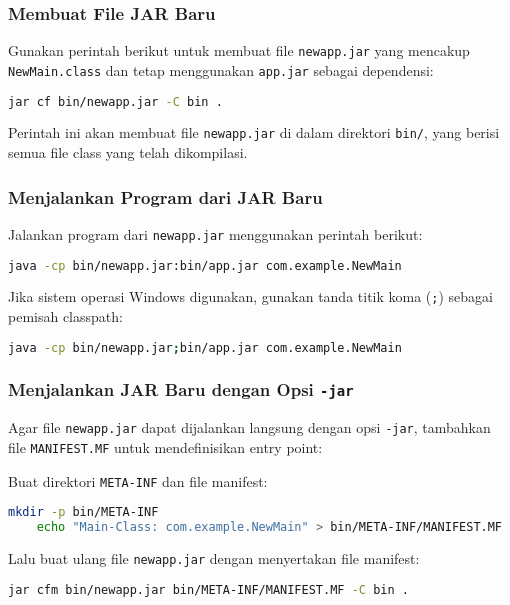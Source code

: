 \subsubsection{Membuat File JAR Baru}
Gunakan perintah berikut untuk membuat file \texttt{newapp.jar} yang mencakup \texttt{NewMain.class} dan tetap menggunakan \texttt{app.jar} sebagai dependensi:

\begin{lstlisting}[language=bash]
	jar cf bin/newapp.jar -C bin .
\end{lstlisting}

Perintah ini akan membuat file \texttt{newapp.jar} di dalam direktori \texttt{bin/}, yang berisi semua file class yang telah dikompilasi.

\subsubsection{Menjalankan Program dari JAR Baru}
Jalankan program dari \texttt{newapp.jar} menggunakan perintah berikut:

\begin{lstlisting}[language=bash]
	java -cp bin/newapp.jar:bin/app.jar com.example.NewMain
\end{lstlisting}

Jika sistem operasi Windows digunakan, gunakan tanda titik koma (\texttt{;}) sebagai pemisah classpath:

\begin{lstlisting}[language=bash]
	java -cp bin/newapp.jar;bin/app.jar com.example.NewMain
\end{lstlisting}

\subsubsection{Menjalankan JAR Baru dengan Opsi \texttt{-jar}}
Agar file \texttt{newapp.jar} dapat dijalankan langsung dengan opsi \texttt{-jar}, tambahkan file \texttt{MANIFEST.MF} untuk mendefinisikan entry point:

Buat direktori \texttt{META-INF} dan file manifest:

\begin{lstlisting}[language=bash]
	mkdir -p bin/META-INF
	echo "Main-Class: com.example.NewMain" > bin/META-INF/MANIFEST.MF
\end{lstlisting}

Lalu buat ulang file \texttt{newapp.jar} dengan menyertakan file manifest:

\begin{lstlisting}[language=bash]
	jar cfm bin/newapp.jar bin/META-INF/MANIFEST.MF -C bin .
\end{lstlisting}

